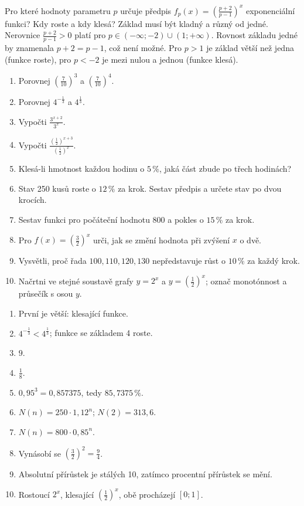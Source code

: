 \documentclass[11pt,a4paper]{article}
\begin{document}
\begin{zadaniReseniBox}[title={Rozšíření 2}]
Pro které hodnoty parametru $p$ určuje předpis $f_p(x)=\left(\frac{p+2}{p-1}\right)^x$ exponenciální funkci? Kdy roste a kdy klesá?
\tcblower
Základ musí být kladný a různý od jedné. Nerovnice $\frac{p+2}{p-1}>0$ platí pro $p\in(-\infty;-2)\cup(1;+\infty)$. Rovnost základu jedné by znamenala $p+2=p-1$, což není možné. Pro $p>1$ je základ větší než jedna (funkce roste), pro $p<-2$ je mezi nulou a jednou (funkce klesá).
\end{zadaniReseniBox}
\begin{zadaniReseniBox}[title={Domácí úkol}]
\begin{enumerate}[label=\alph*)]
\item Porovnej $\left(\frac{7}{10}\right)^3$ a $\left(\frac{7}{10}\right)^4$.
\item Porovnej $4^{-\frac{1}{3}}$ a $4^{\frac{1}{3}}$.
\item Vypočti $\frac{3^{x+2}}{3^x}$.
\item Vypočti $\frac{\left(\frac{1}{2}\right)^{x+3}}{\left(\frac{1}{2}\right)^x}$.
\item Klesá-li hmotnost každou hodinu o $5\,\%$, jaká část zbude po třech hodinách?
\item Stav 250 kusů roste o $12\,\%$ za krok. Sestav předpis a určete stav po dvou krocích.
\item Sestav funkci pro počáteční hodnotu 800 a pokles o $15\,\%$ za krok.
\item Pro $f(x)=\left(\frac{3}{2}\right)^x$ urči, jak se změní hodnota při zvýšení $x$ o dvě.
\item Vysvětli, proč řada $100,110,120,130$ nepředstavuje růst o $10\,\%$ za každý krok.
\item Načrtni ve stejné soustavě grafy $y=2^x$ a $y=\left(\frac{1}{2}\right)^x$; označ monotónnost a průsečík s osou $y$.
\end{enumerate}
\tcblower
\begin{enumerate}[label=\alph*)]
\item První je větší: klesající funkce.
\item $4^{-\frac{1}{3}}<4^{\frac{1}{3}}$; funkce se základem 4 roste.
\item $9$.
\item $\frac{1}{8}$.
\item $0{,}95^3=0{,}857375$, tedy $85{,}7375\,\%$.
\item $N(n)=250\cdot1{,}12^n$; $N(2)=313{,}6$.
\item $N(n)=800\cdot0{,}85^n$.
\item Vynásobí se $\left(\frac{3}{2}\right)^2=\frac{9}{4}$.
\item Absolutní přírůstek je stálých 10, zatímco procentní přírůstek se mění.
\item Rostoucí $2^x$, klesající $\left(\frac{1}{2}\right)^x$, obě procházejí $[0;1]$.
\end{enumerate}
\end{zadaniReseniBox}
\end{document}
